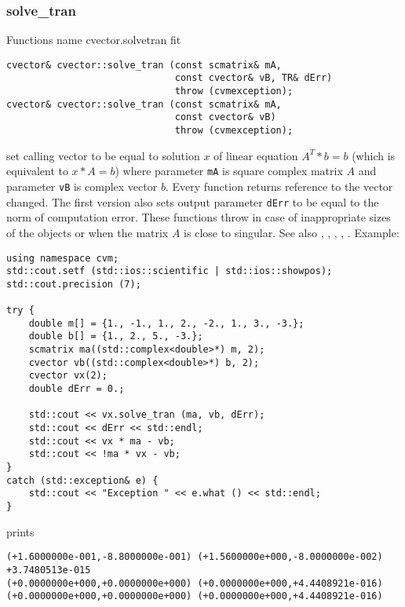 \subsubsection{solve\_tran}
Functions%
\pdfdest name {cvector.solvetran} fit
\begin{verbatim}
cvector& cvector::solve_tran (const scmatrix& mA,
                              const cvector& vB, TR& dErr)
                              throw (cvmexception);
cvector& cvector::solve_tran (const scmatrix& mA,
                              const cvector& vB)
                              throw (cvmexception);
\end{verbatim}
set calling vector to be equal to solution $x$ of linear equation
$A^T*b=b$ (which is equivalent to $x*A=b$) 
where parameter \verb"mA" is  square complex matrix $A$
and parameter \verb"vB" is  complex vector $b$.
Every function returns  reference to the vector changed.
The first version also sets output parameter \verb"dErr" to be equal
to the norm of computation error.
These functions throw 
in case of inappropriate sizes
of the objects or when the matrix $A$ is close to singular.
See also , 
, ,
, .
Example:
\begin{Verbatim}
using namespace cvm;
std::cout.setf (std::ios::scientific | std::ios::showpos);
std::cout.precision (7);

try {
    double m[] = {1., -1., 1., 2., -2., 1., 3., -3.};
    double b[] = {1., 2., 5., -3.};
    scmatrix ma((std::complex<double>*) m, 2);
    cvector vb((std::complex<double>*) b, 2);
    cvector vx(2);
    double dErr = 0.;

    std::cout << vx.solve_tran (ma, vb, dErr);
    std::cout << dErr << std::endl;
    std::cout << vx * ma - vb;
    std::cout << !ma * vx - vb;
}
catch (std::exception& e) {
    std::cout << "Exception " << e.what () << std::endl;
}
\end{Verbatim}
prints
\begin{Verbatim}
(+1.6000000e-001,-8.8000000e-001) (+1.5600000e+000,-8.0000000e-002)
+3.7480513e-015
(+0.0000000e+000,+0.0000000e+000) (+0.0000000e+000,+4.4408921e-016)
(+0.0000000e+000,+0.0000000e+000) (+0.0000000e+000,+4.4408921e-016)
\end{Verbatim}
\newpage




